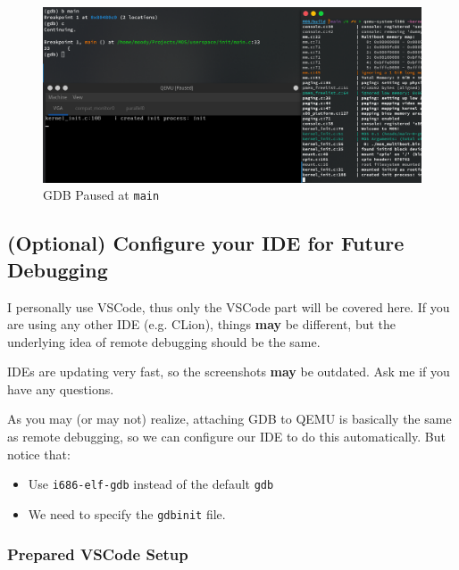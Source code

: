 \begin{figure}[ht]
    \centering
    \includegraphics[width=\textwidth]{assets/c1.gdb-paused.png}
    \caption{GDB Paused at \texttt{main}}
    \label{fig:gdb-paused}
\end{figure}

\subsection{(Optional) Configure your IDE for Future Debugging} \label{sec:ide-config}

\begin{note}
    \item I personally use VSCode, thus only the VSCode part will be covered here. If you are
    using any other IDE (e.g. CLion), things \textbf{may} be different, but the underlying idea
    of remote debugging should be the same.

    \item IDEs are updating very fast, so the screenshots \textbf{may} be outdated. Ask me if you
    have any questions.
\end{note}

As you may (or may not) realize, attaching GDB to QEMU is basically the same as remote debugging, so
we can configure our IDE to do this automatically. But notice that:

\begin{itemize}
    \item Use \texttt{i686-elf-gdb} instead of the default \texttt{gdb}
    \item We need to specify the \texttt{gdbinit} file.
\end{itemize}

\subsubsection{Prepared VSCode Setup} \label{sec:vscode-config}

